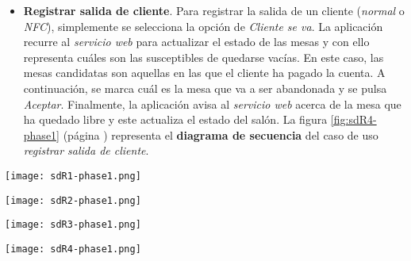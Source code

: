 \begin{itemize}
\item \textbf{Registrar salida de cliente}. Para registrar la salida de un
cliente (\emph{normal} o \emph{\acs{NFC}}), simplemente se selecciona la
opción de \emph{Cliente se va}. La aplicación recurre al \emph{servicio web}
para actualizar el estado de las mesas y con ello representa cuáles son las
susceptibles de quedarse vacías. En este caso, las mesas candidatas son
aquellas en las que el cliente ha pagado la cuenta. A continuación, se marca
cuál es la mesa que va a ser abandonada y se pulsa \emph{Aceptar}. Finalmente,
la aplicación avisa al \emph{servicio web} acerca de la mesa que ha quedado
libre y este actualiza el estado del salón. La figura \ref{fig:sdR4-phase1}
(página \pageref{fig:sdR4-phase1}) representa el \textbf{diagrama de secuencia}
del caso de uso \emph{registrar salida de cliente}.
\end{itemize}

  \begin{sidewaysfigure}[h]
    \begin{center}
      \texttt{[image: sdR1-phase1.png]}
      \caption{Diagrama de secuencia del caso de uso \emph{iniciar nueva
      jornada}.}
      \label{fig:sdR1-phase1}
    \end{center}
  \end{sidewaysfigure}

  \begin{sidewaysfigure}[h]
    \begin{center}
      \texttt{[image: sdR2-phase1.png]}
      \caption{Diagrama de secuencia del caso de uso \emph{iniciar jornada
      existente}.}
      \label{fig:sdR2-phase1}
    \end{center}
  \end{sidewaysfigure}

  \begin{sidewaysfigure}[h]
    \begin{center}
      \texttt{[image: sdR3-phase1.png]}
      \caption{Diagrama de secuencia del caso de uso \emph{registrar llegada
      de cliente}.}
      \label{fig:sdR3-phase1}
    \end{center}
  \end{sidewaysfigure}

  \begin{sidewaysfigure}[h]
    \begin{center}
      \texttt{[image: sdR4-phase1.png]}
      \caption{Diagrama de secuencia del caso de uso \emph{registrar salida
      de cliente}.}
      \label{fig:sdR4-phase1}
    \end{center}
  \end{sidewaysfigure}

